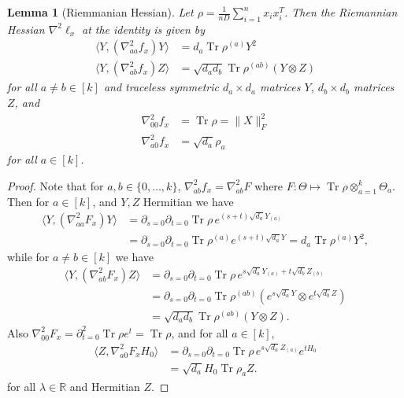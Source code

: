 \documentclass[aos]{imsart}
\newtheorem{lemma}[theorem]{Lemma}
\theoremstyle{definition}
\numberwithin{equation}{section}
\DeclareMathOperator{\tr}{Tr}
\newcommand{\R}{{\mathbb{R}}}
\newcommand{\ot}{\otimes}
\newcommand{\samp}{x}
\newcommand{\ef}{f}
\begin{document}
\begin{lemma}[Riemmanian Hessian]\label{lem:hessian} Let $\rho = \frac{1}{nD}\sum_{i=1}^n \samp_i \samp_i^T$. Then the Riemannian Hessian $\nabla^2 \ell_{\samp}$ at the identity is given by 
\begin{align*}
 \langle Y,  \left( \nabla^2_{aa} \ef_{\samp} \right) Y \rangle
&=  d_a \tr \rho^{(a)} Y^2 \\
  \langle Y,  \left( \nabla^2_{ab} \ef_{\samp} \right) Z \rangle
&= \sqrt{d_a d_b} \tr \rho^{(ab)} \left( Y \ot Z \right)
\end{align*}
for all $a\neq b\in[k]$ and traceless symmetric $d_a\times d_a$ matrices $Y$, $d_b\times d_b$ matrices~$Z$, and
\begin{align*}
\nabla^2_{00} \ef_\samp &=\tr \rho = \|X\|_F^2 \\
\nabla^2_{a0} \ef_\samp &= \sqrt{d_a}\rho_a
\end{align*}
for all $a \in [k]$. 
\end{lemma}
\begin{proof}
Note that for $a,b \in \{0,\dots, k\}$, $\nabla^2_{ab} f_\samp = \nabla^2_{ab} F$ where $F:\Theta \mapsto \tr \rho \ot_{a = 1}^k \Theta_a$. 
  Then for $a \in [k]$, and $Y, Z$ Hermitian we have
  \begin{align*}
   \langle Y,  \left( \nabla^2_{aa} F_{\samp} \right) Y \rangle
  &=  \partial_{s=0} \partial_{t=0} \tr \rho \, e^{(s+t)\sqrt{d_a}  Y_{(a)}} \\
  &= \partial_{s=0} \partial_{t=0} \tr \rho^{(a)} e^{(s+t)  \sqrt{d_a}Y}
  = d_a \tr \rho^{(a)} Y^2,
  \end{align*}
  while for $a\neq b \in [k]$ we have
  \begin{align*}
    \langle Y,  \left( \nabla^2_{ab} F_{\samp} \right) Z \rangle
  &=\partial_{s=0} \partial_{t=0} \tr \rho \, e^{s \sqrt{d_a}Y_{(a)} + t \sqrt{d_b} Z_{(b)}} \\
  &= \partial_{s=0} \partial_{t=0} \tr \rho^{(ab)} \left( e^{s \sqrt{d_a}  Y} \ot e^{t \sqrt{d_b} Z} \right)\\
  &= \sqrt{d_a d_b}  \tr \rho^{(ab)} \left( Y \ot Z \right).
  \end{align*}
 Also $\nabla^2_{00} F_{\samp} =\partial^2_{t=0} \tr \rho  e^{t} = \tr \rho$, and for all $a \in [k],$ 
 \begin{align*}
\langle Z, \nabla^2_{a0} F_{\samp} H_0 \rangle 
  &=  \partial_{s=0} \partial_{t=0} \tr \rho \, e^{s\sqrt{d_a} Z_{(a)}}e^{tH_0} \\
  &= \sqrt{d_a} H_0 \tr \rho_a Z.
  \end{align*}
  for all $\lambda \in \R$ and Hermitian $Z$.
\end{proof}
\end{document}
